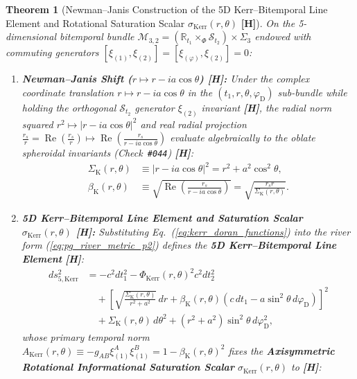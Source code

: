 \documentclass[11pt,a4paper]{article}
\newcommand{\catH}{\textbf{\textcolor{orange!85!black}{[H]}}}
\theoremstyle{plain}
\newtheorem{theorem}{Theorem}[section]
\theoremstyle{definition}
\theoremstyle{remark}
\numberwithin{equation}{section}
\begin{document}
\begin{theorem}[Newman--Janis Construction of the 5D Kerr--Bitemporal Line Element and Rotational Saturation Scalar $\sigma_{\text{Kerr}}(r,\theta)$ \catH]
\label{thm:symplectic_kerr_doran}
On the 5-dimensional bitemporal bundle $\mathcal{M}_{3,2} = (\mathbb{R}_{t_1} \times_{\Phi} \mathcal{S}_{t_2}) \times \Sigma_3$ endowed with commuting generators $[\xi_{(1)}, \xi_{(2)}] = [\xi_{(\varphi)}, \xi_{(2)}] = 0$:
\begin{enumerate}
  \item[\textnormal{(i)}] \textbf{Newman--Janis Shift ($r \mapsto r - i a\cos\theta$) \catH:} Under the complex coordinate translation $r \mapsto r - i a\cos\theta$ in the $(t_1, r, \theta, \varphi_{\text{D}})$ sub-bundle while holding the orthogonal $\mathcal{S}_{t_2}$ generator $\xi_{(2)}$ invariant \catH, the radial norm squared $r^2 \mapsto |r - i a\cos\theta|^2$ and real radial projection $\frac{r_s}{r} = \operatorname{Re}(\frac{r_s}{r}) \mapsto \operatorname{Re}(\frac{r_s}{r - i a\cos\theta})$ evaluate algebraically to the oblate spheroidal invariants (Check~\texttt{\#044}) \catH:
  \begin{align}
    \Sigma_{\text{K}}(r, \theta) &\equiv |r - i a\cos\theta|^2 = r^2 + a^2 \cos^2\theta, \nonumber \\[3pt]
    \beta_{\text{K}}(r, \theta) &\equiv \sqrt{\operatorname{Re}\!\left(\frac{r_s}{r - i a\cos\theta}\right)} = \sqrt{\frac{r_s r}{\Sigma_{\text{K}}(r, \theta)}}.
    \label{eq:kerr_doran_functions}
  \end{align}
  \item[\textnormal{(ii)}] \textbf{5D Kerr--Bitemporal Line Element and Saturation Scalar $\sigma_{\text{Kerr}}(r,\theta)$ \catH:} Substituting Eq.~(\ref{eq:kerr_doran_functions}) into the river form (\ref{eq:pg_river_metric_p2}) defines the \textbf{5D Kerr--Bitemporal Line Element} \catH:
  \begin{align}
    ds_{5,\text{Kerr}}^2 &= -c^2 dt_1^2 - \Phi_{\text{Kerr}}(r,\theta)^2 c^2 dt_2^2 \nonumber\\[3pt]
    &\quad + \left[ \sqrt{\frac{\Sigma_{\text{K}}(r,\theta)}{r^2 + a^2}}\,dr + \beta_{\text{K}}(r,\theta) \left( c\,dt_1 - a\sin^2\theta\,d\varphi_{\text{D}} \right) \right]^2 \nonumber\\[3pt]
    &\quad + \Sigma_{\text{K}}(r,\theta)\,d\theta^2 + \left(r^2 + a^2\right)\sin^2\theta\,d\varphi_{\text{D}}^2,
    \label{eq:master_5d_kerr_bitemporal}
  \end{align}
  whose primary temporal norm $A_{\text{Kerr}}(r,\theta) \equiv -g_{AB}\xi_{(1)}^A\xi_{(1)}^B = 1 - \beta_{\text{K}}(r,\theta)^2$ fixes the \textbf{Axisymmetric Rotational Informational Saturation Scalar} $\sigma_{\text{Kerr}}(r, \theta)$ to \catH:

\end{enumerate}
\end{theorem}
\end{document}
